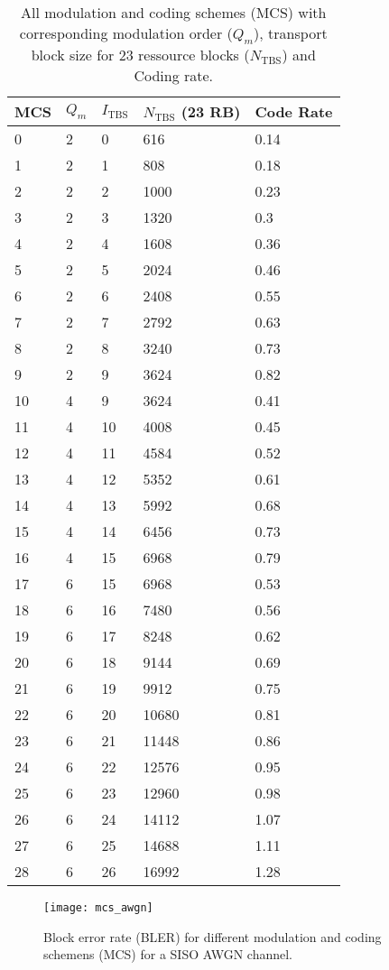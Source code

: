 \documentclass[a4paper,10pt]{article}
\begin{document}
\begin{table}
\centering
\footnotesize
\begin{tabular}{|l|l|l|l|l|}
\hline
MCS&$Q_m$&$I_{\mathrm{TBS}}$&$N_{\mathrm{TBS}}$ (23 RB)&Code Rate\\
\hline
0&2&0&616&0.14\\
1&2&1&808&0.18\\
2&2&2&1000&0.23\\
3&2&3&1320&0.3\\
4&2&4&1608&0.36\\
5&2&5&2024&0.46\\
6&2&6&2408&0.55\\
7&2&7&2792&0.63\\
8&2&8&3240&0.73\\
9&2&9&3624&0.82\\
10&4&9&3624&0.41\\
11&4&10&4008&0.45\\
12&4&11&4584&0.52\\
13&4&12&5352&0.61\\
14&4&13&5992&0.68\\
15&4&14&6456&0.73\\
16&4&15&6968&0.79\\
17&6&15&6968&0.53\\
18&6&16&7480&0.56\\
19&6&17&8248&0.62\\
20&6&18&9144&0.69\\
21&6&19&9912&0.75\\
22&6&20&10680&0.81\\
23&6&21&11448&0.86\\
24&6&22&12576&0.95\\
25&6&23&12960&0.98\\
26&6&24&14112&1.07\\
27&6&25&14688&1.11\\
28&6&26&16992&1.28\\
\hline
\end{tabular}
\caption{All modulation and coding schemes (MCS) with corresponding modulation order ($Q_m$), transport block size for 23 ressource blocks ($N_{\mathrm{TBS}}$) and Coding rate.}
\label{tab:mcs}
\end{table}


\begin{figure}
 \centering
 \texttt{[image: mcs\_awgn]}
 \caption{Block error rate (BLER) for different modulation and coding schemens (MCS) for a SISO AWGN channel.}
 \label{fig:mcs}
\end{figure} 
\end{document}
